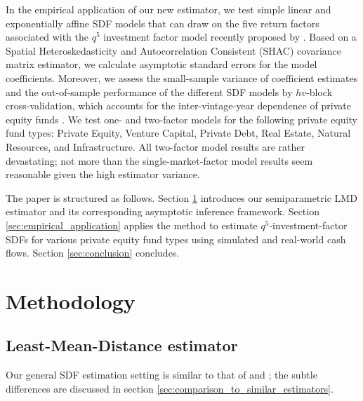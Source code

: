 \documentclass[12pt]{article}
\begin{document}
In the empirical application of our new estimator, we test simple linear and exponentially affine SDF models that can draw on the five return factors associated with the $q^5$ investment factor model recently proposed by \cite{HXZ20}.
Based on a Spatial Heteroskedasticity and Autocorrelation Consistent (SHAC) covariance matrix estimator, we calculate asymptotic standard errors for the model coefficients.
Moreover, we assess the small-sample variance of coefficient estimates and the out-of-sample performance of the different SDF models by $hv$-block cross-validation, which accounts for the inter-vintage-year dependence of private equity funds \citep{R00}.
We test one- and two-factor models for the following private equity fund types: Private Equity, Venture Capital, Private Debt, Real Estate, Natural Resources, and Infrastructure.
All two-factor model results are rather devastating; not more than the single-market-factor model results seem reasonable given the high estimator variance.

The paper is structured as follows. 
Section \ref{sec:Methodology} introduces our semiparametric LMD estimator and its corresponding asymptotic inference framework.
Section \ref{sec:empirical_application} applies the method to estimate $q^5$-investment-factor SDFs for various private equity fund types using simulated and real-world cash flows.
Section \ref{sec:conclusion} concludes.


\section{Methodology}
\label{sec:Methodology}

\subsection{Least-Mean-Distance estimator}
\label{sec:fundwise_lmd_estimator}

Our general SDF estimation setting is similar to that of \cite{DLP12} and \cite{KN16}; the subtle differences are discussed in section \ref{sec:comparison_to_similar_estimators}.
\end{document}
